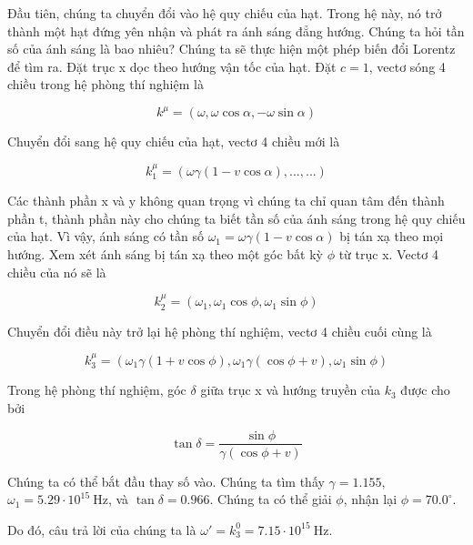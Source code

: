 \begin{solution}

Đầu tiên, chúng ta chuyển đổi vào hệ quy chiếu của hạt. Trong hệ này, nó trở thành một hạt đứng yên nhận và phát ra ánh sáng đẳng hướng. Chúng ta hỏi tần số của ánh sáng là bao nhiêu? Chúng ta sẽ thực hiện một phép biến đổi Lorentz để tìm ra. Đặt trục x dọc theo hướng vận tốc của hạt. Đặt $c=1$, vectơ sóng 4 chiều trong hệ phòng thí nghiệm là 

$$k^{\mu}=(\omega, \omega  \cos \alpha, -\omega \sin \alpha ) $$

Chuyển đổi sang hệ quy chiếu của hạt, vectơ 4 chiều mới là 

$$k_1^{\mu}=(\omega \gamma (1-v\cos\alpha), ..., ...)$$

Các thành phần x và y không quan trọng vì chúng ta chỉ quan tâm đến thành phần t, thành phần này cho chúng ta biết tần số của ánh sáng trong hệ quy chiếu của hạt. Vì vậy, ánh sáng có tần số $\omega_1=\omega \gamma (1-v\cos\alpha)$ bị tán xạ theo mọi hướng. Xem xét ánh sáng bị tán xạ theo một góc bất kỳ $\phi$ từ trục x. Vectơ 4 chiều của nó sẽ là

$$k_2^{\mu}=(\omega_1, \omega_1 \cos \phi, \omega_1 \sin \phi)$$

Chuyển đổi điều này trở lại hệ phòng thí nghiệm, vectơ 4 chiều cuối cùng là 

$$k_3^{\mu}=(\omega_1 \gamma (1+v\cos\phi), \omega_1 \gamma (\cos\phi+v), \omega_1 \sin \phi)$$

Trong hệ phòng thí nghiệm, góc $\delta$ giữa trục x và hướng truyền của $k_3$ được cho bởi

$$\tan \delta = \frac{\sin \phi}{\gamma(\cos\phi+v)}$$

Chúng ta có thể bắt đầu thay số vào. Chúng ta tìm thấy $\gamma=1.155$, $\omega_1=5.29\cdot 10^{15} \ \mathrm{Hz}$, và $\tan \delta=0.966$. Chúng ta có thể giải $\phi$, nhận lại $\phi=70.0^{\circ}$. 

Do đó, câu trả lời của chúng ta là $\boxed{\omega'=k_3^0=7.15\cdot 10^{15} \ \mathrm{Hz}}$.

\end{solution}
